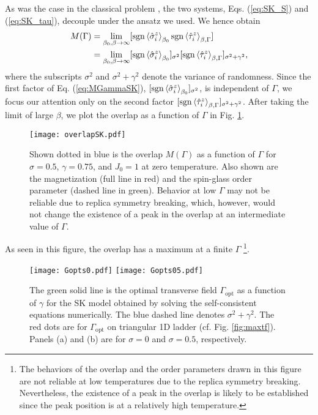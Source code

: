 \documentclass[aps,pra,twocolumn,groupedaddress,longbibliography]{revtex4}
\newcommand{\Sig}{\sigma}
\begin{document}
As was the case in the classical problem \cite{Nishimura2016}, the two systems, Eqs. (\ref{eq:SK_S}) and (\ref{eq:SK_tau}), decouple under the ansatz we used. We hence obtain 
\begin{align}
	\label{eq:MGammaSK}
	M(\Gamma) &= \lim_{\beta_0, \beta \to \infty} [\mathrm{sgn}\braket{\hat{\Sig}_{i}^z}_{\beta_0}\mathrm{sgn}\braket{\hat{\tau}_{i}^z}_{\beta, \Gamma}] \nonumber \\
	&= \lim_{\beta_0, \beta \to \infty} [\mathrm{sgn}\braket{\hat{\Sig}_{i}^z}_{\beta_0}]_{\sigma^2}[\mathrm{sgn}\braket{\hat{\tau}_{i}^z}_{\beta, \Gamma}]_{\sigma^2+\gamma^2},
\end{align}
where the subscripts $\sigma^2$ and $\sigma^2+\gamma^2$ denote the variance of randomness. Since the first factor of Eq. (\ref{eq:MGammaSK}), $[\mathrm{sgn}\braket{\hat{\Sig}_{i}^z}_{\beta_0}]_{\sigma^2}$, is independent of $\Gamma$, we focus our attention only on the second factor $[\mathrm{sgn}\braket{\hat{\tau}_{i}^z}_{\beta, \Gamma}]_{\sigma^2+\gamma^2}$. After taking the limit of large $\beta$, we plot the overlap as a function of $\Gamma$ in Fig. \ref{fig:overlapSK}.
\begin{figure}
	\centering
	\texttt{[image: overlapSK.pdf]}
	\caption{Shown dotted in blue is the overlap $M(\Gamma)$ as a function of $\Gamma$ for $\sigma=0.5$, $\gamma=0.75$, and $J_0 = 1$ at zero temperature. Also shown are the magnetization (full line in red) and the spin-glass order parameter (dashed line in green). Behavior at low $\Gamma$ may not be reliable due to replica symmetry breaking, which, however, would not change the existence of a peak in the overlap at an intermediate value of $\Gamma$.}
	\label{fig:overlapSK}
\end{figure}
As seen in this figure, the overlap has a  maximum at a finite $\Gamma$ \footnote{The behaviors of the overlap and the order parameters drawn in this figure are not reliable at low temperatures due to the replica symmetry breaking.  Nevertheless, the existence of a peak in the overlap is likely to be established since the peak position is at a relatively high temperature.}.

\begin{figure*}
	\centering
	
	\texttt{[image: Gopts0.pdf]}
	\texttt{[image: Gopts05.pdf]}

	\caption{The green solid line is the optimal transverse field $\Gamma_{\mathrm{opt}}$ as a function of $\gamma$ for the SK model obtained by solving the self-consistent equations numerically. The blue dashed line denotes $\sigma^2+\gamma^2$. The red dots are for $\Gamma_{\mathrm{opt}}$ on triangular 1D ladder (cf. Fig. \ref{fig:maxtf}). Panels (a) and (b) are for $\sigma = 0$ and $\sigma = 0.5$, respectively.}
	\label{fig:Gopt}
\end{figure*}
\end{document}
